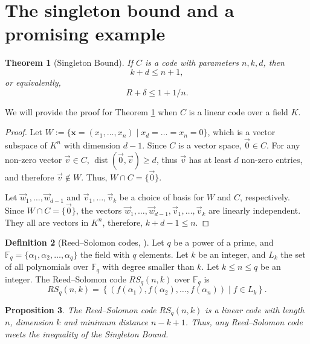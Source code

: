 \documentclass[11pt, oneside]{amsart}
\newtheorem{thm}{Theorem}[section]
\newtheorem{prop}[thm]{Proposition}
\theoremstyle{definition}
\newtheorem{defn}[thm]{Definition}
\theoremstyle{remark}
\numberwithin{equation}{section}
\DeclareMathOperator{\dist}{dist}
\begin{document}
\section{The singleton bound and a promising example} \label{s:singleton}
\begin{thm}[Singleton Bound]\label{thm:singleton_bound}
If $C$ is a code with parameters $n, k, d$, then 
	\begin{equation} %
		k + d \le n + 1,
	\end{equation} 
	or equivalently, 
	\begin{equation}
		R + \delta \le 1 + 1/n.
	\end{equation}
\end{thm}
	
We will provide the proof for Theorem \ref{thm:singleton_bound} when $C$ is a linear code over a field $K$.

\begin{proof}
	Let $W := \{\mathbf{x} = (x_1, \dots, x_n) \mid x_{d} = \dots = x_n = 0\}$, which is a vector subspace of $K^n$ with dimension $d - 1$. Since $C$ is a vector space, $\vec 0 \in C$. For any non-zero vector $\vec v \in C$, $\dist(\vec 0, \vec v) \ge d$, thus $\vec v$ has at least $d$ non-zero entries, and therefore $\vec v \notin W$. Thus, $W \cap C = \{\vec 0\}$.

	Let $\vec w_1, \dots, \vec w_{d-1}$ and $\vec v_1, \dots, \vec v_k$ be a choice of basis for $W$ and $C$, respectively. Since $W \cap C = \{\vec 0\}$, the vectors $\vec w_1, \dots, \vec w_{d-1}, \vec v_1, \dots, \vec v_k$ are linearly independent. They all are vectors in $K^n$, therefore, $k + d - 1 \le n$.
\end{proof}

\begin{defn}[Reed--Solomon codes, \cite{LS87}]\label{defn:rs_codes}
	Let $q$ be a power of a prime, and $\mathbb{F}_q = \{\alpha_1, \alpha_2, \dots, \alpha_q\}$ the field with $q$ elements.
	Let $k$ be an integer, and ${L}_k$ the set of all polynomials over $\mathbb{F}_q$ with degree smaller than $k$.
	Let $k \le n \le q$ be an integer. The Reed--Solomon code $RS_q(n, k)$ over $\mathbb{F}_q$ is 
	\begin{equation}
		RS_q(n, k) = \left\{\left(f(\alpha_1), f(\alpha_2), \dots, f(\alpha_n)\right) \mid f \in {L}_k\right\}.
	\end{equation}
\end{defn}

\begin{prop}
	The Reed--Solomon code $RS_q(n, k)$ is a linear code with length $n$, dimension $k$ and minimum distance $n - k + 1$.
	Thus, any Reed--Solomon code meets the inequality of the Singleton Bound.
\end{prop}
\end{document}
